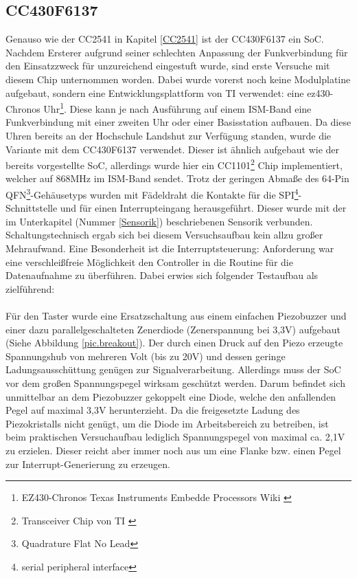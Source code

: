 \documentclass[12pt]{scrreprt} %
\begin{document}
\subsection{CC430F6137}
Genauso wie der CC2541 in Kapitel \vref{CC2541} ist der CC430F6137 ein SoC. Nachdem Ersterer aufgrund seiner schlechten Anpassung der Funkverbindung für den Einsatzzweck für unzureichend eingestuft wurde, sind erste Versuche mit diesem Chip unternommen worden. Dabei wurde vorerst noch keine Modulplatine aufgebaut, sondern eine Entwicklungsplattform von TI verwendet: eine ez430-Chronos Uhr\footnote{EZ430-Chronos Texas Instruments Embedde Processors Wiki \citep{EZ430}}. Diese kann je nach Ausführung auf einem ISM-Band eine Funkverbindung mit einer zweiten Uhr oder einer Basisstation aufbauen. Da diese Uhren bereits an der Hochschule Landshut zur Verfügung standen, wurde die Variante mit dem CC430F6137 verwendet.  Dieser ist ähnlich aufgebaut wie der bereits vorgestellte SoC, allerdings wurde hier ein CC1101\footnote{Transceiver Chip von TI \citep{CC1101}} Chip implementiert, welcher auf 868MHz im ISM-Band sendet. Trotz der geringen Abmaße des 64-Pin QFN\footnote{Quadrature Flat No Lead}-Gehäusetyps wurden mit Fädeldraht die Kontakte für die SPI\footnote{serial peripheral interface}-Schnittstelle und für einen Interrupteingang herausgeführt. Dieser wurde mit der im Unterkapitel (Nummer \vref{Sensorik}) beschriebenen Sensorik verbunden. Schaltungstechnisch ergab sich bei diesem Versuchsaufbau kein allzu großer Mehraufwand. Eine Besonderheit ist die Interruptsteuerung: Anforderung war eine verschleißfreie Möglichkeit den Controller in die Routine für die Datenaufnahme zu überführen. Dabei erwies sich folgender Testaufbau als zielführend:\\
\\
Für den Taster wurde eine Ersatzschaltung aus einem einfachen Piezobuzzer und einer dazu parallelgeschalteten Zenerdiode (Zenerspannung bei 3,3V) aufgebaut (Siehe Abbildung \vref{pic.breakout}). Der durch einen Druck auf den Piezo erzeugte Spannungshub von mehreren Volt (bis zu 20V) und dessen geringe Ladungsausschüttung genügen zur Signalverarbeitung. Allerdings muss der SoC vor dem großen Spannungspegel wirksam geschützt werden. Darum befindet sich unmittelbar an dem Piezobuzzer gekoppelt eine Diode, welche den anfallenden Pegel auf maximal 3,3V herunterzieht. Da die freigesetzte Ladung des Piezokristalls nicht genügt, um die Diode im Arbeitsbereich zu betreiben, ist beim praktischen Versuchaufbau lediglich Spannungspegel von maximal ca. 2,1V zu erzielen. Dieser reicht aber immer noch aus um eine Flanke bzw. einen Pegel zur Interrupt-Generierung zu erzeugen. 
\end{document}
